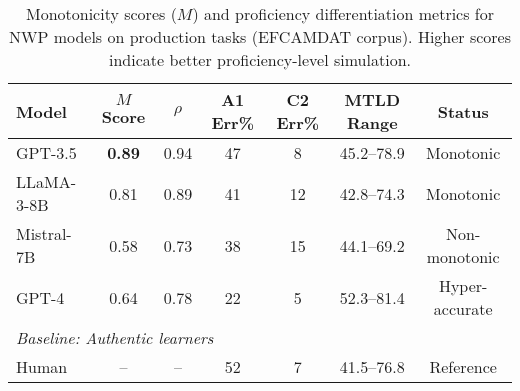 \begin{table}[ht]
\centering
\caption{Monotonicity scores ($M$) and proficiency differentiation metrics for NWP models on production tasks (EFCAMDAT corpus). Higher scores indicate better proficiency-level simulation.}
\label{tab:production_monotonicity}
\small
\begin{tabular}{lcccccc}
\toprule
\textbf{Model} & \textbf{$M$ Score} & \textbf{$\rho$} & \textbf{A1 Err\%} & \textbf{C2 Err\%} & \textbf{MTLD Range} & \textbf{Status} \\
\midrule
GPT-3.5 & \textbf{0.89} & 0.94 & 47 & 8 & 45.2--78.9 & Monotonic \\
LLaMA-3-8B & 0.81 & 0.89 & 41 & 12 & 42.8--74.3 & Monotonic \\
Mistral-7B & 0.58 & 0.73 & 38 & 15 & 44.1--69.2 & Non-monotonic \\
GPT-4 & 0.64 & 0.78 & 22 & 5 & 52.3--81.4 & Hyper-accurate \\
\midrule
\multicolumn{7}{l}{\textit{Baseline: Authentic learners}} \\
Human & -- & -- & 52 & 7 & 41.5--76.8 & Reference \\
\bottomrule
\end{tabular}
\end{table}
